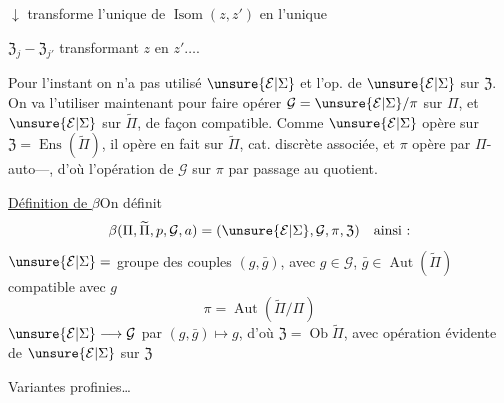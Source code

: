 $\downarrow$ transforme l'unique  de $\operatorname{Isom}(z,z')$ en l'unique  $\mathfrak Z_j\mathbin{-}\mathfrak Z_{j'}$ transformant $z$ en $z'\ldots.$

Pour l'instant on n'a pas utilisé $\unsure{\mathcal E|\Sigma}$ et l'op. de $\unsure{\mathcal E|\Sigma}$ sur $\mathfrak Z$. On va l'utiliser maintenant pour faire opérer $\mathcal G=\unsure{\mathcal E|\Sigma}/\pi$ sur $\Pi$, et $\unsure{\mathcal E|\Sigma}$ sur $\widetilde\Pi$, de façon compatible.
Comme $\unsure{\mathcal E|\Sigma}$ opère sur $\mathfrak Z=\operatorname{Ens}(\widetilde\Pi)$, il opère en fait sur $\widetilde\Pi$, cat. discrète associée,  et  $\pi$ opère par $\Pi$-auto---, d'où l'opération de $\mathcal G$ sur $\pi$ par passage au quotient.

\uline{Définition de $\beta$}\qquad On définit
\[
\beta(\Pi,\widetilde\Pi,p,\mathcal G,a)=(\unsure{\mathcal E|\Sigma},\mathcal G,\pi,\mathfrak Z)\quad\text{ainsi :}
\]
$\unsure{\mathcal E|\Sigma}=$ groupe des couples $(g,\bar g)$, avec $g\in\mathcal G$, $\bar g\in\operatorname{Aut}(\widetilde\Pi)$ compatible avec $g$
\[
\pi=\operatorname{Aut}(\widetilde\Pi/\Pi)
\]
$\unsure{\mathcal E|\Sigma}\longrightarrow\mathcal G$ par $(g,\bar g)\longmapsto g$, d'où
$\mathfrak Z=\operatorname{Ob}\widetilde\Pi$, avec opération évidente de $\unsure{\mathcal E|\Sigma}$ sur $\mathfrak Z$

Variantes profinies\ldots

